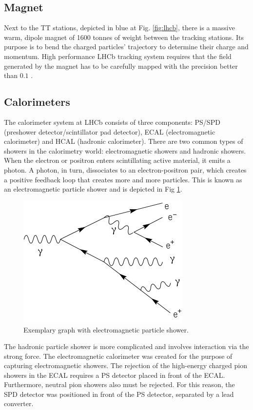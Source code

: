 \subsection{Magnet}

Next to the TT stations, depicted in blue at Fig. \ref{fig:lhcb}, there is a massive warm, dipole magnet of 1600 tonnes of weight between the tracking stations. Its purpose is to bend the charged particles' trajectory to determine their charge and momentum.
High performance LHCb tracking system requires that the field generated by the magnet has to be carefully mapped with the precision better than $0.1$ \textperthousand.


\subsection{Calorimeters}
The calorimeter system at LHCb consists of three components: PS/SPD (preshower detector/scintillator pad detector), ECAL (electromagnetic calorimeter) and HCAL (hadronic calorimeter).
There are two common types of showers in the calorimetry world: electromagnetic showers and hadronic showers.
When the electron or positron enters scintillating active material, it emits a photon.
A photon, in turn, dissociates to an electron-positron pair, which creates a positive feedback loop that creates more and more particles.
This is known as an electromagnetic particle shower and is depicted in Fig \ref{fig:em_shower}.

\begin{figure}[ht]
  \centering
  \includegraphics[width=0.35\linewidth]{figures/chapter2/Schematic_of_a_particle_shower.svg.png}
  \caption[something]{Exemplary graph with electromagnetic particle shower\footnotemark. }

  \label{fig:em_shower}
\end{figure}


The hadronic particle shower is more complicated and involves interaction via the strong force.
The electromagnetic calorimeter was created for the purpose of capturing electromagnetic showers.
The rejection of the high-energy charged pion showers in the ECAL requires a PS detector placed in front of the ECAL.
Furthermore, neutral pion showers also must be rejected. For this reason, the SPD detector was positioned in front of the PS detector, separated by a lead converter.

